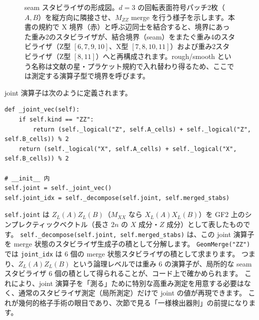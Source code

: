 \begin{figure}[htbp]
  \caption{seam スタビライザの形成図。$d=3$ の回転表面符号パッチ2枚（$A, B$）を縦方向に隣接させ、$M_{ZZ}$ merge を行う様子を示します。本書の規約で X 境界（赤）と呼ぶ辺同士を結合すると、境界にあった重み2のスタビライザが、結合境界（seam）をまたぐ重み4のスタビライザ（Z型 $[6,7,9,10]$、X型 $[7,8,10,11]$）および重み2スタビライザ（Z型 $[8,11]$）へと再構成されます。rough/smooth という名称は文献の星・プラケット規約で入れ替わり得るため、ここでは測定する演算子型で境界を呼びます\cite{horsman2012lattice,fowler2012surface}。}
  \label{fig:ch10_seam_stabilizer}
\end{figure}


joint 演算子は次のように定義されます。

\begin{lstlisting}[caption={joint 演算子と seam スタビライザによる分解（src/stages/01\_mpp/src/ftqc/geom\_lattice\_surgery.py）}]
def _joint_vec(self):
    if self.kind == "ZZ":
        return (self._logical("Z", self.A_cells) + self._logical("Z", self.B_cells)) % 2
    return (self._logical("X", self.A_cells) + self._logical("X", self.B_cells)) % 2

# __init__ 内
self.joint = self._joint_vec()
self.joint_idx = self._decompose(self.joint, self.merged_stabs)
\end{lstlisting}

\texttt{self.joint} は $Z_L(A)Z_L(B)$（$M_{XX}$ なら $X_L(A)X_L(B)$）を GF2 上のシンプレクティックベクトル（長さ $2n$ の $X$ 成分・$Z$ 成分）として表したものです。
\texttt{self.\_decompose(self.joint, self.merged\_stabs)} は、この joint 演算子を merge 状態のスタビライザ生成子の積として分解します。
\texttt{GeomMerge("ZZ")} では \texttt{joint\_idx} は 6 個の merge 状態スタビライザの積として求まります。
つまり、$Z_L(A)Z_L(B)$ という論理レベルでは重み 6 の演算子が、局所的な seam スタビライザ 6 個の積として得られることが、コード上で確かめられます。
これにより、joint 演算子を「測る」ために特別な高重み測定を用意する必要はなく、通常のスタビライザ測定（局所測定）だけで joint の値が再現できます。
これが幾何的格子手術の眼目であり、次節で見る「一様検出器則」の前提になります。

